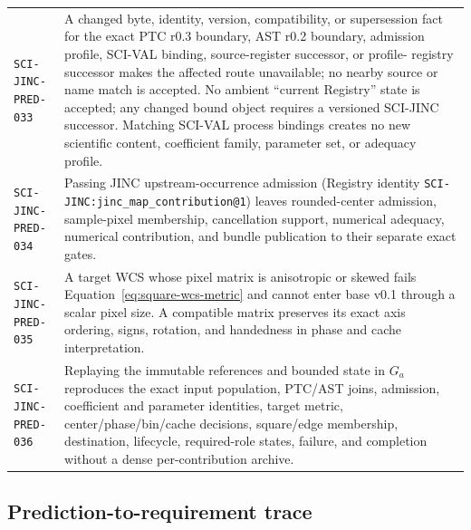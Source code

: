 \begin{longtable}{@{}>{\raggedright\arraybackslash}p{}
                        >{\raggedright\arraybackslash}p{}@{}}
\texttt{SCI-JINC-PRED-033} & A changed byte, identity, version, compatibility,
or supersession fact for the exact PTC r0.3 boundary, AST r0.2 boundary,
admission profile, SCI-VAL binding, source-register successor, or profile-
registry successor makes the affected route unavailable; no nearby source or
name match is accepted.  No ambient ``current Registry'' state is accepted;
any changed bound object requires a versioned SCI-JINC successor.  Matching
SCI-VAL process bindings creates no new
scientific content, coefficient family, parameter set, or adequacy profile. \\
\texttt{SCI-JINC-PRED-034} & Passing
JINC upstream-occurrence admission (Registry identity
\texttt{SCI-JINC:jinc\_map\_contribution@1}) leaves rounded-center admission,
sample-pixel membership, cancellation support, numerical adequacy, numerical
contribution, and bundle publication to their separate exact gates. \\
\texttt{SCI-JINC-PRED-035} & A target WCS whose pixel matrix is anisotropic or
skewed fails Equation~\eqref{eq:square-wcs-metric} and cannot enter base v0.1
through a scalar pixel size.  A compatible matrix preserves its exact axis
ordering, signs, rotation, and handedness in phase and cache interpretation. \\
\texttt{SCI-JINC-PRED-036} & Replaying the immutable references and bounded
state in $G_a$ reproduces the exact input population, PTC/AST joins, admission,
coefficient and parameter identities, target metric, center/phase/bin/cache
decisions, square/edge membership, destination, lifecycle, required-role
states, failure, and completion without a dense per-contribution archive. \\
\bottomrule
\end{longtable}

\subsection{Prediction-to-requirement trace}

